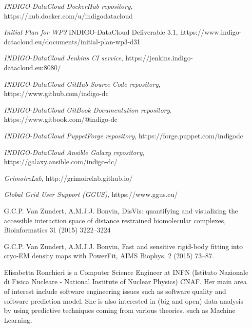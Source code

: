 \documentclass[journal]{IEEEtran}
\begin{document}
\begin{thebibliography}{1}
\emph{INDIGO-DataCloud DockerHub repository},
https://hub.docker.com/u/indigodatacloud

\emph{Initial Plan for WP3} INDIGO-DataCloud Deliverable 3.1,
https://www.indigo-datacloud.eu/documents/initial-plan-wp3-d31

\emph{INDIGO-DataCloud Jenkins CI service},
https://jenkins.indigo-datacloud.eu:8080/

\emph{INDIGO-DataCloud GitHub Source Code repository},
https://www.github.com/indigo-dc

\emph{INDIGO-DataCloud GitBook Documentation repository},
https://www.gitbook.com/@indigo-dc

\emph{INDIGO-DataCloud PuppetForge repository},
https://forge.puppet.com/indigodc

\emph{INDIGO-DataCloud Ansible Galaxy repository},
https://galaxy.ansible.com/indigo-dc/

\emph{GrimoireLab}, http://grimoirelab.github.io/

\emph{Global Grid User Support (GGUS)}, https://www.ggus.eu/

 G.C.P. Van Zundert, A.M.J.J. Bonvin,
DisVis: quantifying and visualizing the accessible interaction space of distance
restrained biomolecular complexes, Bioinformatics 31 (2015) 3222–3224

 G.C.P. Van Zundert, A.M.J.J. Bonvin,
Fast and sensitive rigid-body fitting into cryo-EM density maps with PowerFit,
AIMS Biophys. 2 (2015) 73–87.

\end{thebibliography}

\begin{IEEEbiography} {Elisabetta Ronchieri}
is a Computer Science Engineer at INFN (Istituto Nazionale di Fisica Nucleare - National Institute of Nuclear Physics) CNAF. Her main area of interest include software engineering issues such as software quality and software prediction model. She is also interested in (big and open) data analysis by using predictive techniques coming from various theories. such as Machine Learning.
\end{IEEEbiography}
\end{document}
